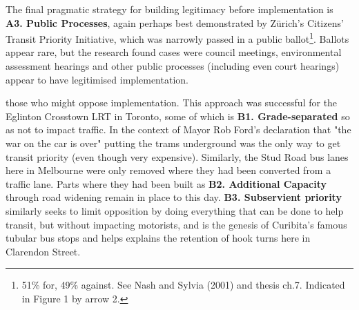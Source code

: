 \documentclass[nobib]{tufte-handout}
\begin{document}
The final pragmatic strategy for building legitimacy before implementation is \textbf{A3. Public Processes}, again perhaps best demonstrated by Zürich's Citizens' Transit Priority Initiative, which was narrowly passed in a public ballot\footnote{51\% for, 49\% against.  See Nash and Sylvia (2001) and thesis ch.7. Indicated in Figure 1 by arrow 2.}. Ballots appear rare, but the research found cases were council meetings, environmental assessment hearings and other public processes (including even court hearings) appear to have legitimised implementation.  

 those who might oppose  implementation.  This approach was successful for the Eglinton Crosstown LRT in Toronto, some of which is \textbf{B1. Grade-separated} so as not to impact traffic. In the context of Mayor Rob Ford's declaration that "the war on the car is over" putting the trams underground was the only way to get transit priority (even though very expensive). Similarly,  the Stud Road bus lanes here in Melbourne were only removed where they had been converted from a traffic lane. Parts where they had been built as \textbf{B2. Additional Capacity} through road widening remain in place to this day.  \textbf{B3. Subservient priority} similarly seeks to limit opposition  by doing everything that can be done to help transit, but without impacting motorists, and is the genesis of Curibita's famous tubular bus stops and helps explains the retention of hook turns here in Clarendon Street. 
\end{document}
